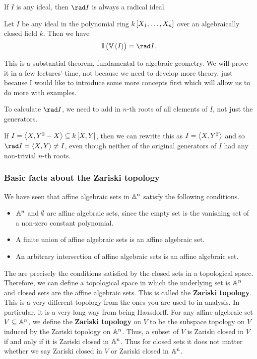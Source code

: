 \begin{note*}
If $ I $ is any ideal, then $ \rad I $ is always a radical ideal.
\end{note*}

\begin{theorem}
\label{thm:strongnullstellensatz}
Let $ I $ be any ideal in the polynomial ring $ k\sbr{X_1, \dots, X_n} $ over an algebraically closed field $ k $. Then we have
$$ \II\br{\VV\br{I}} = \rad I. $$
\end{theorem}

This is a substantial theorem, fundamental to algebraic geometry. We will prove it in a few lectures' time, not because we need to develop more theory, just because I would like to introduce some more concepts first which will allow us to do more with examples.

\begin{note*}
To calculate $ \rad I $, we need to add in $ n $-th roots of all elements of $ I $, not just the generators.
\end{note*}

\begin{example*}
If $ I = \abr{X, Y^2 - X} \subseteq k\sbr{X, Y} $, then we can rewrite this as $ I = \abr{X, Y^2} $ and so $ \rad I = \abr{X, Y} \ne I $, even though neither of the original generators of $ I $ had any non-trivial $ n $-th roots.
\end{example*}

\subsubsection{Basic facts about the Zariski topology}

We have seen that affine algebraic sets in $ \AA^n $ satisfy the following conditions.
\begin{itemize}
\item $ \AA^n $ and $ \emptyset $ are affine algebraic sets, since the empty set is the vanishing set of a non-zero constant polynomial.
\item A finite union of affine algebraic sets is an affine algebraic set.
\item An arbitrary intersection of affine algebraic sets is an affine algebraic set.
\end{itemize}
The are precisely the conditions satisfied by the closed sets in a topological space. Therefore, we can define a topological space in which the underlying set is $ \AA^n $ and closed sets are the affine algebraic sets. This is called the \textbf{Zariski topology}. This is a very different topology from the ones you are used to in analysis. In particular, it is a very long way from being Hausdorff. For any affine algebraic set $ V \subseteq \AA^n $, we define the \textbf{Zariski topology} on $ V $ to be the subspace topology on $ V $ induced by the Zariski topology on $ \AA^n $. Thus, a subset of $ V $ is Zariski closed in $ V $ if and only if it is Zariski closed in $ \AA^n $. Thus for closed sets it does not matter whether we say Zariski closed in $ V $ or Zariski closed in $ \AA^n $.

